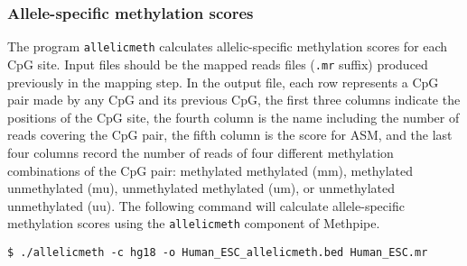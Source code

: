 \documentclass[10pt]{article}
\newcommand{\prog}[1]{\texttt{#1}}
\newcommand{\fn}[1]{\texttt{#1}}
\begin{document}
\subsubsection{Allele-specific methylation scores}
\label{sec:allelic_scores}
The program \prog{allelicmeth} calculates allelic-specific methylation
scores for each CpG site. Input files should be the mapped
reads files (\fn{.mr} suffix) produced previously in the mapping
step. In the output file, each row represents a CpG pair made by any CpG and its previous CpG, the first three columns indicate the positions of the CpG site, the fourth column is the name including the number of reads covering the CpG pair, the fifth column is the score for ASM, and the last four columns record the number of reads of four different methylation combinations of the CpG pair: methylated methylated (mm), methylated unmethylated (mu), unmethylated
methylated (um), or unmethylated unmethylated (uu). The following command will calculate allele-specific methylation scores using the \prog{allelicmeth} component of Methpipe.
\begin{verbatim}
$ ./allelicmeth -c hg18 -o Human_ESC_allelicmeth.bed Human_ESC.mr
\end{verbatim}
\end{document}
